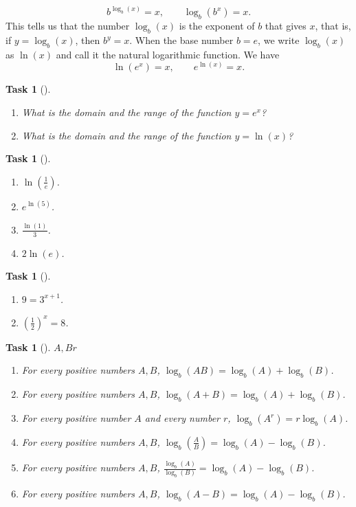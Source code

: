 \documentclass[10pt,]{article}
\theoremstyle{plain}
\newtheorem{proposition}[theorem]{Task}
\theoremstyle{definition}
\numberwithin{equation}{section}
\begin{document}
\begin{equation*}
b^{\log_b(x)}=x, \qquad \log_b(b^x)=x.
\end{equation*}
This tells us that the number \(\log_b(x)\) is the exponent of \(b\) that gives \(x\), that is, if \(y=\log_b(x)\), then \(b^y=x\). When the base number \(b=e\), we write \(\log_b(x)\) as \(\ln(x)\) and call it the natural logarithmic function. We have%
\begin{equation*}
\ln(e^x) = x, \qquad e^{\ln(x)}=x. 
\end{equation*}
%
\begin{proposition}[{}]\label{proposition-26}
\leavevmode%
\begin{enumerate}
\item\hypertarget{li-154}{}What is the domain and the range of the function \(y=e^x\)?%
\item\hypertarget{li-155}{}What is the domain and the range of the function \(y=\ln(x)\)?%
\end{enumerate}
\end{proposition}
\begin{proposition}[{}]\label{proposition-27}
\leavevmode%
\begin{enumerate}
\item\hypertarget{li-156}{}\(\ln(\frac{1}{e})\).%
\item\hypertarget{li-157}{}\(e^{\ln(5)}\).%
\item\hypertarget{li-158}{}\(\frac{\ln(1)}{3}\).%
\item\hypertarget{li-159}{}\(2\ln(e)\).%
\end{enumerate}
\end{proposition}
\begin{proposition}[{}]\label{proposition-28}
\leavevmode%
\begin{enumerate}
\item\hypertarget{li-160}{}\(9 = 3^{x+1}\).%
\item\hypertarget{li-161}{}\((\frac{1}{2})^x=8\).%
\end{enumerate}
\end{proposition}
\begin{proposition}[{}]\label{proposition-29}
\(A, B\)\(r\)\leavevmode%
\begin{enumerate}
\item\hypertarget{li-162}{}For every positive numbers \(A, B\), \(\log_b(AB) = \log_b(A) + \log_b(B)\).%
\item\hypertarget{li-163}{}For every positive numbers \(A, B\), \(\log_b(A+B) = \log_b(A) + \log_b(B)\).%
\item\hypertarget{li-164}{}For every positive number \(A\) and every number \(r\), \(\log_b(A^r) = r\log_b(A)\).%
\item\hypertarget{li-165}{}For every positive numbers \(A, B\), \(\log_b(\frac{A}{B}) = \log_b(A) - \log_b(B)\).%
\item\hypertarget{li-166}{}For every positive numbers \(A, B\), \(\frac{\log_b(A)}{\log_b(B)} = \log_b(A) - \log_b(B)\).%
\item\hypertarget{li-167}{}For every positive numbers \(A, B\), \(\log_b(A - B) = \log_b(A) - \log_b(B)\).%
\end{enumerate}
\end{proposition}
\end{document}
